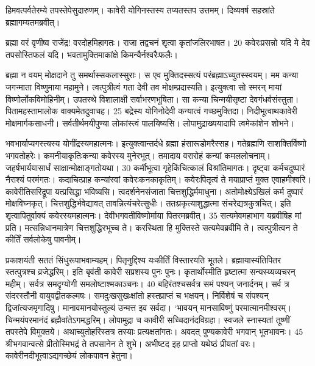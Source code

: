 हिमवत्पर्वतेरम्ये तपस्तेपेसुदारुणम्।
 कावेरी योगिनस्तस्य तप्यतस्तप उत्तमम्।
 दिव्यवर्ष सहस्रांते ब्रह्मागम्यतमब्रवीत्।
 
ब्रह्मा
वरं वृणीष्व राजेंद्र! वरदोहमिहागतः।
 राजा तद्वचनं शृत्वा कृतांजलिरभाषत।
 20 कवेरःप्रसन्नो यदि मे देव तपसोस्तिफलं यदि।
 भवतामुक्तिमाकांक्षे किमन्यैर्नश्वरैःफलैः।
 
ब्रह्मा
न वयम् मोक्षदाने तु समर्थास्सकलास्सुराः।
 स एव मुक्तिदस्सत्यं परंब्रह्माऽच्युतस्स्वयम्।
 मम कन्या जगन्माता विष्णुमाया महामुने।
 त्वत्पुत्रीत्वं गता देवी तव मोक्षम्प्रदास्यति।
 इत्युक्त्वा सो स्मरन् मायां विष्णोर्लोकविमोहिनीम्।
 उपतस्थे विशालाक्षी सर्वाभरणभूषिता।
 सा कन्या चिन्मयीसृष्टा देवगंधर्वसंस्तुता।
 पितामहस्तामालोक वाक्यमेतदुवाचह।
 25 बद्रेस्य योगिनोदेवी कन्यात्वं गच्छमुक्तिदा।
 निदीभूत्वाथकावेरी मोक्षमार्गकसाधनी।
 सर्वतीर्थमयीपुण्या लोकांस्त्वं पालयिष्यसि।
 लोपामुद्राख्ययादापि त्वमेकांशेन शोभने।
 
भवभार्याप्यगस्त्यस्य योगींद्रस्यमहात्मनः।
 इत्युक्त्वान्तर्दधे ब्रह्मा हंसारूडोमरैस्सह।
 गतेब्रह्मणि साशक्तिर्विष्णो भगवतोहरेः।
 कमनीयाकृतिःकन्या कवेरस्य मुनेरभूत्।
 तमादाय वरारोहं कन्यां कमललोचनाम्।
 जहर्षभार्ययासार्धं साक्षान्मोक्षाङ्गतोयथा।
 30 कर्मीभूत्वा गृहेकिंचित्कालं विश्रांतिमागतः।
 दृष्ट्वा कर्मचदुष्पारं नैराश्यं परमंगतः।
 कदाचित्प्राह कन्यांस्वां कवेरःकनकाकृतिम्।
 कवेरःपितृत्वं ते मयाप्राप्तं मुक्त एवाहमीश्वरि।
 कावेरीतिसरिद्रूपा यत्प्रसिद्धा भविष्यसि।
 त्वदर्शनेनसंजाता चित्तशुद्धिर्ममाधुना।
 अतोमोक्ष्येऽखिलं कर्म दुष्पारं मोक्षविघ्नकृत्।
 चित्तशुद्धिर्भवेद्यावत् तावन्नित्यंचरेत्सुधीः।
 ततःप्रकृत्याशुद्धात्मा संचरेद्यत्रकुत्रचित्।
 इति शृत्वापितुर्वाक्यं कवेरस्यमहात्मनः।
 देवीभगवतीविष्णोर्माया पितरमब्रवीत्।
 35 सत्यमेवमहाभाग यब्रवीषिह मां प्रति।
 मत्सन्निधानमात्रेण चित्तशुद्धिरभूच्च ते।
 करस्थिता हि मुक्तिस्ते सत्यमेवब्रवीमि ते।
 त्वत्पुत्रीत्वन ते कीर्तिं सर्वलोकेषु पावनीम्।
 
प्रकाशयंती सततं सिंधुरूपाभवाम्यहम्।
 पितृनुद्दिश्य यःकीर्तिं विस्तारयति भूतले।
 ब्रह्मायास्यंतिपितर स्तत्पुत्रश्च व्रजेद्धरिम्।
 इति बृवंती कावेरी सप्रशस्य पुनः पुनः।
 कृतार्थोस्मीति हृष्टात्मा सन्यस्य्यव्यचरन् महीम्।
 सर्वत्र समदृग्योगी समलोष्टाश्मकाञ्चनः।
 40 बहिरंतश्चसर्वत्र समं पश्यन् जनार्दनम्।
 सर्व त्र संदरस्तौनी वायुवद्वीतकल्मषः।
 समदुःखसुखःक्षांतो हस्तप्राप्तं च भक्षयन्।
 निर्विशेषं च संपश्यन् द्विजांत्यजमृगादिषु।
 मानावमानयोस्तुल्यं उन्मत्त इव सर्वदा।
 ‘भावयन् मानसाविष्णुं परमात्मानमीश्वरम्।
 चिन्मयंपरमानंदं ब्रह्मैवांतेऽगमद्धरिम्।
 लोपामुद्रा च कावीरी सच्चिदानंदविग्रहा।
 स्वजले स्नास्यतां तूष्णीं तपस्तेपे विमुक्तये।
 अथाच्युतोहरिस्तत्र तस्याः प्रत्यक्षतांगतः।
 अवदत् पुण्यकावेरी भगवान् भूतभावनः।
 45 श्रीभगवान्वत्से प्रीतोस्मिभद्रं ते तपसानेन ते शुभे।
 अभीष्टद इह प्राप्तो यथेष्ठं प्रीयतां वरः।
 कावेरीनदीभूत्वाऽद्यगच्छेयं लोकपावन हेतुना।
 
